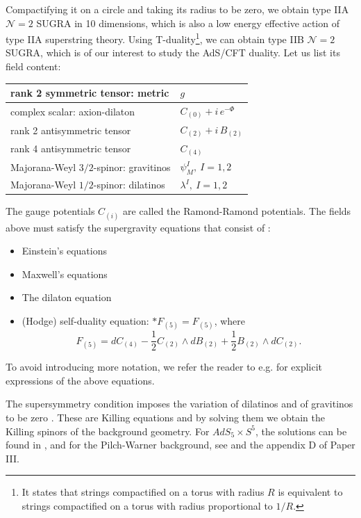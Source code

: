 Compactifying it on a circle and taking its radius to be zero, 
we obtain type IIA $\mathcal{N}=2$ SUGRA in 10 dimensions,
which is also a low energy effective action of type IIA superstring theory.
Using T-duality\footnote{
It states that strings compactified on a torus with radius $R$ is equivalent to strings compactified on a torus with
radius proportional to $1/R$.}, 
we can obtain type IIB $\mathcal{N}=2$ SUGRA,
which is of our interest to study the AdS/CFT duality.
Let us list its field content:
\begin{center}
 \begin{tabular}{ |l | l| }
  \hline
  rank 2 symmetric tensor: metric & $g$ \\  \hline
  complex scalar: axion-dilaton  & $C_{(0)} + i \,e^{-\Phi}$ \\ \hline
  rank 2 antisymmetric tensor & $C_{(2)} + i \, B_{(2)}$ \\ \hline
  rank 4 antisymmetric tensor & $C_{(4)}$\\\hline
  Majorana-Weyl $3/2$-spinor: gravitinos & $\psi_M^I, \: I=1,2 $\\\hline
  Majorana-Weyl $1/2$-spinor: dilatinos & $\lambda^I, \: I=1,2 $ \\\hline
\end{tabular}
\end{center}
The gauge potentials $C_{(i)}$ are called the Ramond-Ramond potentials.
The fields above must satisfy the supergravity equations that consist of \cite{Schwarz:1983qr}:
\begin{itemize}
 \item Einstein's equations
 \item Maxwell's equations
 \item The dilaton equation
 \item (Hodge) self-duality equation: $*F_{(5)} = F_{(5)}$,  where \\
	\begin{equation} \label{5form}
	 F_{(5)} = dC_{(4)} - \dfrac{1}{2} C_{(2)}\wedge dB_{(2)} + \dfrac{1}{2} B_{(2)} \wedge dC_{(2)}.
	\end{equation}
\end{itemize}
To avoid introducing more notation, we refer the reader to e.g. \cite{Buchel:2000cn} 
for explicit expressions of the above equations.

The supersymmetry condition imposes the variation of dilatinos and of gravitinos to be zero \cite{Schwarz:1983qr}.
These are Killing equations and by solving them we obtain the Killing spinors of the background geometry.
For $AdS_5 \times S^5$, the solutions can be found in \cite{Skenderis:2002vf},
and for the Pilch-Warner background, see \cite{Pilch:2003jg} and the appendix D of Paper III.



